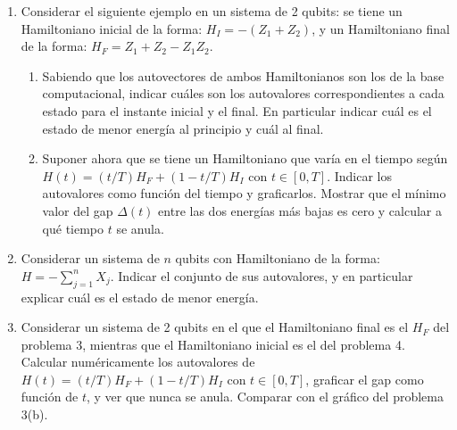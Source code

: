 \documentclass[a4paper,11pt,spanish]{article}
\newcommand{\ket}[1]{|#1\rangle}
\begin{document}
\begin{enumerate}
Considerar el siguiente caso particular: $E_0=0$, y $\alpha(0)=\beta(0)=1/\sqrt{2}$, o sea el estado inicial es el $\ket{+}$. Calcular cu\'anto tiempo tengo que esperar para que el estado se transforme en el $\ket{-}$.

\item Considerar el siguiente ejemplo en un sistema de 2 qubits: se tiene un Hamiltoniano inicial de la forma: $H_I = -(Z_1+Z_2)$, y un Hamiltoniano final de la forma: $H_F=Z_1 +Z_2-Z_1Z_2$. 
\begin{enumerate}
 \item Sabiendo que los autovectores de ambos Hamiltonianos son los de la base computacional, indicar cu\'ales son los autovalores correspondientes a cada estado para el instante inicial y el final. En particular indicar cu\'al es el estado de menor energ\'ia al principio y cu\'al al final.
 \item Suponer ahora que se tiene un Hamiltoniano que var\'ia en el tiempo seg\'un $H(t)= (t/T) H_F + (1-t/T) H_I$ con $t\in[0,T]$. Indicar los autovalores como funci\'on del tiempo y graficarlos. Mostrar que el m\'inimo valor del gap $\Delta(t)$ entre las dos energ\'ias m\'as bajas es cero y calcular a qu\'e tiempo $t$ se anula.
\end{enumerate}

\item Considerar un sistema de $n$ qubits con Hamiltoniano de la forma: $H=-\sum_{j=1}^n X_j$. Indicar el conjunto de sus autovalores, y en particular explicar cu\'al es el estado de menor energ\'ia.

\item Considerar un sistema de 2 qubits en el que el Hamiltoniano final es el $H_F$ del problema 3, mientras que el Hamiltoniano inicial es el del problema 4. Calcular num\'ericamente los autovalores de $H(t)= (t/T) H_F + (1-t/T) H_I$ con $t\in[0,T]$, graficar el gap como función de $t$, y ver que nunca se anula. Comparar con el gráfico del problema 3(b).

\end{enumerate}

\newpage


\end{document}
